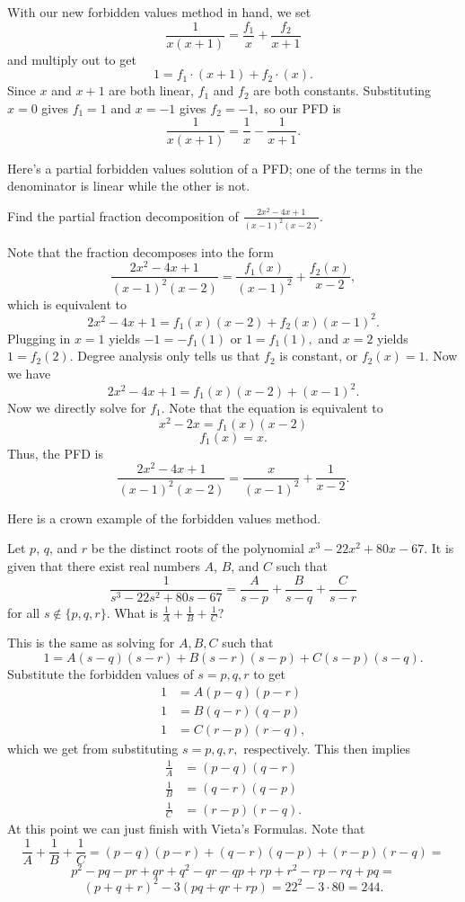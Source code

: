 \documentclass[mast]{lucky}
\begin{document}
\begin{sol}
With our new forbidden values method in hand, we set
\[\frac{1}{x(x+1)}=\frac{f_1}{x}+\frac{f_2}{x+1}\]
and multiply out to get
\[1=f_1\cdot (x+1)+f_2\cdot (x).\]
Since $x$ and $x+1$ are both linear, $f_1$ and $f_2$ are both constants. Substituting $x=0$ gives $f_1=1$ and $x=-1$ gives $f_2=-1,$ so our PFD is
\[\frac{1}{x(x+1)}=\frac{1}{x}-\frac{1}{x+1}.\]
\end{sol}

Here's a partial forbidden values solution of a PFD; one of the terms in the denominator is linear while the other is not.

\begin{exam}
Find the partial fraction decomposition of $\frac{2x^2-4x+1}{(x-1)^2(x-2)}.$
\end{exam}

\begin{sol}
Note that the fraction decomposes into the form
\[\frac{2x^2-4x+1}{(x-1)^2(x-2)}=\frac{f_1(x)}{(x-1)^2}+\frac{f_2(x)}{x-2},\]
which is equivalent to
\[2x^2-4x+1=f_1(x)(x-2)+f_2(x)(x-1)^2.\]
Plugging in $x=1$ yields $-1=-f_1(1)$ or $1=f_1(1),$ and $x=2$ yields $1=f_2(2).$ Degree analysis only tells us that $f_2$ is constant, or $f_2(x)=1.$ Now we have
\[2x^2-4x+1=f_1(x)(x-2)+(x-1)^2.\]
Now we directly solve for $f_1.$ Note that the equation is equivalent to
\[x^2-2x=f_1(x)(x-2)\]
\[f_1(x)=x.\]
Thus, the PFD is
\[\frac{2x^2-4x+1}{(x-1)^2(x-2)}=\frac{x}{(x-1)^2}+\frac{1}{x-2}.\]
\end{sol}

Here is a crown example of the forbidden values method.

\begin{exam}[AMC 10A 2019/24]
Let $p$, $q$, and $r$ be the distinct roots of the polynomial $x^3 - 22x^2 + 80x - 67$. It is given that there exist real numbers $A$, $B$, and $C$ such that\[\dfrac{1}{s^3 - 22s^2 + 80s - 67} = \dfrac{A}{s-p} + \dfrac{B}{s-q} + \frac{C}{s-r}\]for all $s\not\in\{p,q,r\}$. What is $\tfrac1A+\tfrac1B+\tfrac1C$?
\end{exam}

\begin{sol}
This is the same as solving for $A,B,C$ such that
\[1=A(s-q)(s-r)+B(s-r)(s-p)+C(s-p)(s-q).\]
Substitute the forbidden values of $s=p,q,r$ to get
\begin{align*}
1&=A(p-q)(p-r) \\
1&=B(q-r)(q-p) \\
1&=C(r-p)(r-q),
\end{align*}
which we get from substituting $s=p,q,r,$ respectively. This then implies
\begin{align*}
\frac{1}{A}&=(p-q)(q-r) \\
\frac{1}{B}&=(q-r)(q-p) \\
\frac{1}{C}&=(r-p)(r-q).
\end{align*}
At this point we can just finish with Vieta's Formulas. Note that
\[\frac{1}{A}+\frac{1}{B}+\frac{1}{C}=(p-q)(p-r)+(q-r)(q-p)+(r-p)(r-q)=\]
\[p^2-pq-pr+qr+q^2-qr-qp+rp+r^2-rp-rq+pq=\]
\[(p+q+r)^2-3(pq+qr+rp)=22^2-3\cdot 80=244.\]
\end{sol}
\end{document}
